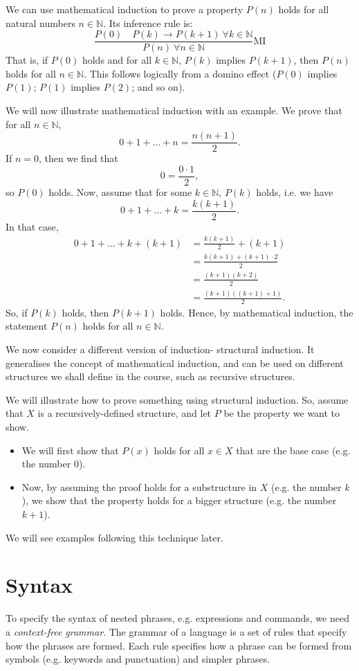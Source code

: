 \documentclass[a4paper, openany]{memoir}
\begin{document}
    We can use mathematical induction to prove a property $P(n)$ holds for all natural numbers $n \in \mathbb{N}$. Its inference rule is:
    \[\frac{P(0) \quad P(k) \to P(k+1) \ \forall k \in \mathbb{N}}{P(n) \ \forall n \in \mathbb{N}} \textrm{MI}\]
    That is, if $P(0)$ holds and for all $k \in \mathbb{N}$, $P(k)$ implies $P(k+1)$, then $P(n)$ holds for all $n \in \mathbb{N}$. This follows logically from a domino effect ($P(0)$ implies $P(1)$; $P(1)$ implies $P(2)$; and so on).

    We will now illustrate mathematical induction with an example. We prove that for all $n \in \mathbb{N}$,
    \[0 + 1 + \dots + n = \frac{n(n+1)}{2}.\]
    If $n = 0$, then we find that
    \[0 = \frac{0 \cdot 1}{2},\]
    so $P(0)$ holds. Now, assume that for some $k \in \mathbb{N}$, $P(k)$ holds, i.e. we have
    \[0 + 1 + \dots + k = \frac{k(k+1)}{2}.\]
    In that case,
    \begin{align*}
        0 + 1 + \dots + k + (k+1) &= \frac{k(k+1)}{2} + (k+1) \\
        &= \frac{k(k+1) + (k+1) \cdot 2}{2} \\
        &= \frac{(k+1)(k+2)}{2} \\
        &= \frac{(k+1)((k+1) + 1)}{2}.
    \end{align*}
    So, if $P(k)$ holds, then $P(k+1)$ holds. Hence, by mathematical induction, the statement $P(n)$ holds for all $n \in \mathbb{N}$.

    We now consider a different version of induction- structural induction. It generalises the concept of mathematical induction, and can be used on different structures we shall define in the course, such as recursive structures.
    
    We will illustrate how to prove something using structural induction. So, assume that $X$ is a recursively-defined structure, and let $P$ be the property we want to show.
    \begin{itemize}
        \item We will first show that $P(x)$ holds for all $x \in X$ that are the base case (e.g. the number $0$).
        \item Now, by assuming the proof holds for a substructure in $X$ (e.g. the number $k$), we show that the property holds for a bigger structure (e.g. the number $k+1$).
    \end{itemize}
    We will see examples following this technique later.

    \newpage

    \section{Syntax}
    To specify the syntax of nested phrases, e.g. expressions and commands, we need a \emph{context-free grammar}. The grammar of a language is a set of rules that specify how the phrases are formed. Each rule specifies how a phrase can be formed from symbols (e.g. keywords and punctuation) and simpler phrases.
\end{document}
